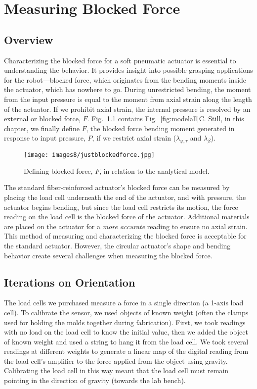 \chapter{Measuring Blocked Force}
\label{chapter:blockedforce}

\section{Overview}
Characterizing the blocked force for a soft pneumatic actuator is essential to understanding the behavior. It provides insight into possible grasping applications for the robot—blocked force, which originates from the bending moments inside the actuator, which has nowhere to go. During unrestricted bending, the moment from the input pressure is equal to the moment from axial strain along the length of the actuator. If we prohibit axial strain, the internal pressure is resolved by an external or blocked force, $F$. Fig.~\ref{fig:justblockedforce} contains Fig.~\ref{fig:modelall}C. Still, in this chapter, we finally define $F$, the blocked force bending moment generated in response to input pressure, $P$, if we restrict axial strain ($\lambda_{\varphi,\tau}$ and $\lambda_\beta$). 

\begin{figure}[ht]
    \centering
     \texttt{[image: images8/justblockedforce.jpg]}
    \caption{Defining blocked force, $F$, in relation to the analytical model.}
    \label{fig:justblockedforce}
\end{figure}

The standard fiber-reinforced actuator's blocked force can be measured by placing the load cell underneath the end of the actuator, and with pressure, the actuator begins bending, but since the load cell restricts its motion, the force reading on the load cell is the blocked force of the actuator. Additional materials are placed on the actuator for a \emph{more accurate} reading to ensure no axial strain. This method of measuring and characterizing the blocked force is acceptable for the standard actuator. However, the circular actuator's shape and bending behavior create several challenges when measuring the blocked force. 

\section{Iterations on Orientation}

The load cells we purchased measure a force in a single direction (a 1-axis load cell). To calibrate the sensor, we used objects of known weight (often the clamps used for holding the molds together during fabrication). First, we took readings with no load on the load cell to know the initial value, then we added the object of known weight and used a string to hang it from the load cell. We took several readings at different weights to generate a linear map of the digital reading from the load cell's amplifier to the force applied from the object using gravity. Calibrating the load cell in this way meant that the load cell must remain pointing in the direction of gravity (towards the lab bench). 

